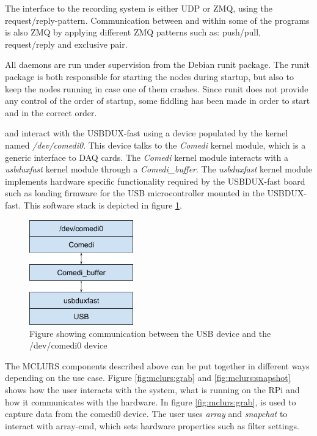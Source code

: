 
The interface to the recording system is either UDP or ZMQ, using the request/reply-pattern. Communication  between and within some of the programs is also ZMQ by applying different ZMQ patterns such as: push/pull, request/reply and exclusive pair.

All daemons are run under supervision from the Debian runit package. The runit package is both responsible for starting the nodes during startup, but also to keep the nodes running in case one of them crashes. Since runit does not provide any control of the order of startup, some fiddling has been made in order to start  and  in the correct order.


 \label{sec:existingsystem:software:kernelmodule}
 and  interact with the USBDUX-fast using a device populated by the kernel named \textit{/dev/comedi0}.
This device talks to the \textit{Comedi} kernel module, which is a generic interface to \ac{DAQ} cards. The  \textit{Comedi} kernel module interacts with a \textit{usbduxfast} kernel module through a \textit{Comedi\_buffer}.
The \textit{usbduxfast} kernel module implements hardware specific functionality required by the USBDUX-fast board such as loading firmware for the USB microcontroller mounted in the USBDUX-fast.
This software stack is depicted in figure \ref{fig:existingsystem:kernel}.

\begin{figure}[H]
	\centering
	\includegraphics[width=0.4\textwidth]{figures/mclurs_comedi}
	\caption{Figure showing communication between the USB device and the /dev/comedi0 device}
	\label{fig:existingsystem:kernel}
\end{figure}

 \label{sc:existingsystem:setup}
The MCLURS components described above can be put together in different ways depending on the use case. Figure \ref{fig:mclurs:grab} and \ref{fig:mclurs:snapshot} shows how the user interacts with the system, what is running on the \ac{RPi} and how it communicates with the hardware. In figure \ref{fig:mclurs:grab},  is used to capture data from the comedi0 device. The user uses \textit{array} and \textit{snapchat} to interact with array-cmd, which sets hardware properties such as filter settings.

